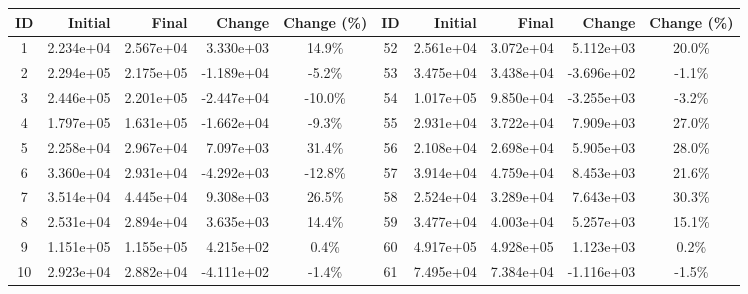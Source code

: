 \newpage
{}
\begin{table}
    \centering
    \begin{tabular}{|c|r|r|r|c||c|r|r|r|c|}
        \hline
        \textbf{ID} & \textbf{Initial} & \textbf{Final} & \textbf{Change} & \textbf{Change (\%)} & \textbf{ID} & \textbf{Initial} & \textbf{Final} & \textbf{Change} & \textbf{Change (\%)} \\
        \hline
        1           & 2.234e+04        & 2.567e+04      & 3.330e+03       & 14.9\%               & 52          & 2.561e+04        & 3.072e+04      & 5.112e+03       & 20.0\%               \\
        2           & 2.294e+05        & 2.175e+05      & -1.189e+04      & -5.2\%               & 53          & 3.475e+04        & 3.438e+04      & -3.696e+02      & -1.1\%               \\
        3           & 2.446e+05        & 2.201e+05      & -2.447e+04      & -10.0\%              & 54          & 1.017e+05        & 9.850e+04      & -3.255e+03      & -3.2\%               \\
        4           & 1.797e+05        & 1.631e+05      & -1.662e+04      & -9.3\%               & 55          & 2.931e+04        & 3.722e+04      & 7.909e+03       & 27.0\%               \\
        5           & 2.258e+04        & 2.967e+04      & 7.097e+03       & 31.4\%               & 56          & 2.108e+04        & 2.698e+04      & 5.905e+03       & 28.0\%               \\
        6           & 3.360e+04        & 2.931e+04      & -4.292e+03      & -12.8\%              & 57          & 3.914e+04        & 4.759e+04      & 8.453e+03       & 21.6\%               \\
        7           & 3.514e+04        & 4.445e+04      & 9.308e+03       & 26.5\%               & 58          & 2.524e+04        & 3.289e+04      & 7.643e+03       & 30.3\%               \\
        8           & 2.531e+04        & 2.894e+04      & 3.635e+03       & 14.4\%               & 59          & 3.477e+04        & 4.003e+04      & 5.257e+03       & 15.1\%               \\
        9           & 1.151e+05        & 1.155e+05      & 4.215e+02       & 0.4\%                & 60          & 4.917e+05        & 4.928e+05      & 1.123e+03       & 0.2\%                \\
        10          & 2.923e+04        & 2.882e+04      & -4.111e+02      & -1.4\%               & 61          & 7.495e+04        & 7.384e+04      & -1.116e+03      & -1.5\%               \\

\end{tabular}
\end{table}
